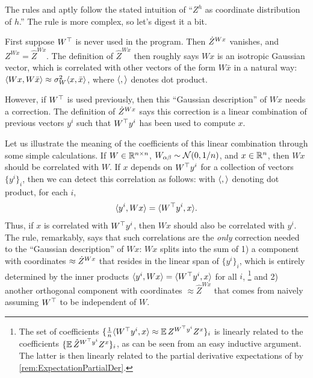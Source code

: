 \documentclass[main.tex]{subfiles}
\begin{document}
\begin{rem}\label{rem:ZIntuition}

    The rules  and  aptly follow the stated intuition of ``$Z^h$ as coordinate distribution of $h$.''
    The  rule is more complex, so let's digest it a bit.
    
    First suppose $W^\top$ is never used in the program.
    Then $\dot Z^{Wx}$ vanishes, and $Z^{Wx} = \hat Z^{Wx}$.
    The definition of $\hat Z^{Wx}$ then roughly says $Wx$ is an isotropic Gaussian vector, which is correlated with other vectors of the form $W\bar x$ in a natural way:
    $\langle Wx, W\bar x \rangle \approx \sigma_W^2 \langle x, \bar x \rangle$, where $\langle,\rangle$ denotes dot product.
    
    However, if $W^\top$ is used previously, then this ``Gaussian description'' of $Wx$ needs a correction.
    The definition of $\dot Z^{Wx}$ says this correction is a linear combination of previous vectors $y^i$ such that $W^\top y^i$ has been used to compute $x$.
    
    
    
    Let us illustrate the meaning of the coefficients of this linear combination through some simple calculations.
    If $W\in\mathbb{R}^{n\times n}$, $W_{\alpha\beta}\sim\mathcal{N}(0,1/n)$, and $x\in\mathbb{R}^{n}$, then $Wx$ should be correlated with $W$.
    If $x$ depends on $W^\top y^i$ for a collection of vectors $\{y^i\}_i$, then we can detect this correlation as follows:
    with $\langle,\rangle$ denoting dot product, for each $i$,
    \[
    \langle y^{i},Wx\rangle=\langle W^{\top}y^{i},x\rangle.
    \]
    Thus, if $x$ is correlated with $W^{\top}y^{i}$, then $Wx$ should also be correlated with $y^{i}$. The  rule, remarkably, says that such correlations are the \emph{only} correction needed to the ``Gaussian description'' of $Wx$: ${Wx}$ splits into the sum of 1) a component with coordinates $\approx \dot Z^{Wx}$ that resides in the linear span of $\{y^{i}\}_{i}$, which is entirely determined by the inner products $\langle y^{i},Wx\rangle=\langle W^{\top}y^{i},x\rangle$ for all $i$,%
    \footnote{
        The set of coefficients $\{\frac{1}{n} \langle W^{\top}y^{i},x\rangle \approx \operatorname*{\mathbb{E}} Z^{W^{\top}y^{i}} Z^x\}_i$ is linearly related to the coefficients $\{\operatorname*{\mathbb{E}} \hat Z^{W^{\top}y^{i}} Z^x\}_i$, as can be seen from an easy inductive argument.
        The latter is then linearly related to the partial derivative expectations of  by \cref{rem:ExpectationPartialDer}.
    } and 2) another orthogonal component with coordinates $\approx\hat{Z}^{Wx}$ that comes from naively assuming $W^{\top}$ to be independent of $W$.

\end{rem}
\end{document}
